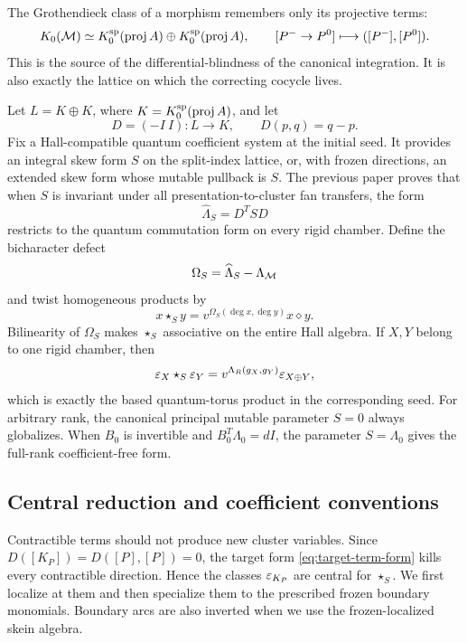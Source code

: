 The Grothendieck class of a morphism remembers only its projective terms:
\begin{equation}
 K_0(\mathcal M)\simeq
 K_0^{\rm sp}(\operatorname{proj} A)\oplus K_0^{\rm sp}(\operatorname{proj} A),
 \qquad
 [P^-\to P^0]\longmapsto([P^-],[P^0]).
 \label{eq:term-lattice}
\end{equation}
This is the source of the differential-blindness of the canonical integration.
It is also exactly the lattice on which the correcting cocycle lives.

Let $L=K\oplus K$, where $K=K_0^{\rm sp}(\operatorname{proj} A)$, and let
\[
 D=(-I\ I):L\longrightarrow K,
 \qquad D(p,q)=q-p.
\]
Fix a Hall-compatible quantum coefficient system at the initial seed.  It
provides an integral skew form $S$ on the split-index lattice, or, with frozen
directions, an extended skew form whose mutable pullback is $S$.  The previous
paper proves that when $S$ is invariant under all presentation-to-cluster fan
transfers, the form
\begin{equation}
 \widehat\Lambda_S=D^TSD
 \label{eq:target-term-form}
\end{equation}
restricts to the quantum commutation form on every rigid chamber.  Define the
bicharacter defect
\begin{equation}
 \Omega_S=\widehat\Lambda_S-\Lambda_{\mathcal M}
 \label{eq:Hall-cocycle}
\end{equation}
and twist homogeneous products by
\begin{equation}
 x\star_S y
 =v^{\Omega_S(\deg x,\deg y)}x\diamond y.
 \label{eq:twisted-Hall-product}
\end{equation}
Bilinearity of $\Omega_S$ makes $\star_S$ associative on the entire Hall
algebra.  If $X,Y$ belong to one rigid chamber, then
\begin{equation}
 \varepsilon_X\star_S\varepsilon_Y
 =v^{\Lambda_R(g_X,g_Y)}\varepsilon_{X\oplus Y},
 \label{eq:compatible-Hall-quantum}
\end{equation}
which is exactly the based quantum-torus product in the corresponding seed.
For arbitrary rank, the canonical principal mutable parameter $S=0$ always
globalizes.  When $B_0$ is invertible and $B_0^T\Lambda_0=dI$, the parameter
$S=\Lambda_0$ gives the full-rank coefficient-free form.

\subsection{Central reduction and coefficient conventions}

Contractible terms should not produce new cluster variables.  Since
$D([K_P])=D([P],[P])=0$, the target form
\eqref{eq:target-term-form} kills every contractible direction.  Hence the
classes $\varepsilon_{K_P}$ are central for $\star_S$.  We first localize at them and
then specialize them to the prescribed frozen boundary monomials.  Boundary
arcs are also inverted when we use the frozen-localized skein algebra.

